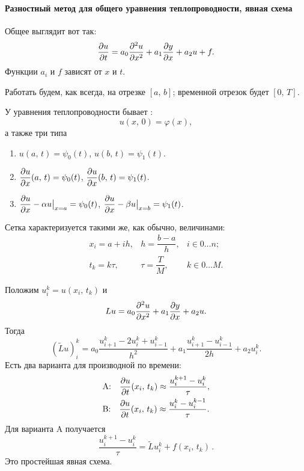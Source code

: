 \documentclass{trlnotes}
\begin{document}
    \paragraph{Разностный метод для общего уравнения теплопроводности, явная схема}

    \begin{de}
        Общее  выглядит вот так:
        \[
            \dfrac{\partial u}{\partial t} = a_0 \dfrac{\partial^2 u}{\partial x^2} + a_1 \dfrac{\partial y}{\partial x} + a_2 u + f.
        \]
        Функции $a_i$ и $f$ зависят от $x$ и $t$.
    \end{de}

    Работать будем, как всегда, на отрезке $[a, \, b]$; временной отрезок будет $[0, \, T]$.

    \begin{de}
        У уравнения теплопроводности бывает :
        \[
            u(x, \, 0) = \varphi(x),            
        \]
        а также три типа 
        \begin{enumerate}
            \item $u(a, \, t) = \psi_0(t)$, $u(b, \, t) = \psi_1(t)$.
            \item $\dfrac{\partial u}{\partial x}(a, \, t) = \psi_0(t)$, $\dfrac{\partial u}{\partial x}(b, \, t) = \psi_1(t)$.
            \item $\dfrac{\partial u}{\partial x} - \alpha u \big|_{x = a} = \psi_0(t)$, $\dfrac{\partial u}{\partial x} - \beta u \big|_{x = b} = \psi_1(t)$.
        \end{enumerate}
    \end{de}
    Сетка характеризуется такими же, как обычно, величинами:
    \[
        \begin{array}{lll}
            x_i = a + ih, & h = \dfrac{b - a}{h}, & i \in 0\ldots n; \\
            t_k = k\tau, & \tau = \dfrac{T}{M}, & k \in 0 \ldots M.
        \end{array}
    \]

    Положим $u_i^k = u(x_i, \, t_k)$ и
    \[
        Lu = a_0 \dfrac{\partial^2 u}{\partial x^2} + a_1 \dfrac{\partial y}{\partial x} + a_2 u.
    \]
    Тогда
    \[
        (\tilde{L}u)_i^k = a_0 \dfrac{u_{i+1}^k - 2u_i^k + u_{i - 1}^k}{h^2} + a_1 \dfrac{u_{i + 1}^k - u_{i - 1}^k}{2h} + a_2 u_i^k.
    \]
    Есть два варианта для производной по времени:
    \begin{align}\label{eq:therm-A-B}
        &\text{A:} \quad \dfrac{\partial u}{\partial t}(x_i, \, t_k) \approx \dfrac{u^{k + 1}_i - u^k_i}{\tau}, \\
        &\text{B:} \quad \dfrac{\partial u}{\partial t}(x_i, \, t_k) \approx \dfrac{u^{k}_i - u^{k-1}_i}{\tau}.
    \end{align}
    Для варианта A получается 
    \[
        \boxed{\dfrac{u_i^{k + 1} - u_i^k}{\tau} = \tilde{L}u_i^k + f(x_i, \, t_k)}\,.
    \]
    Это простейшая явная схема. 
\end{document}
